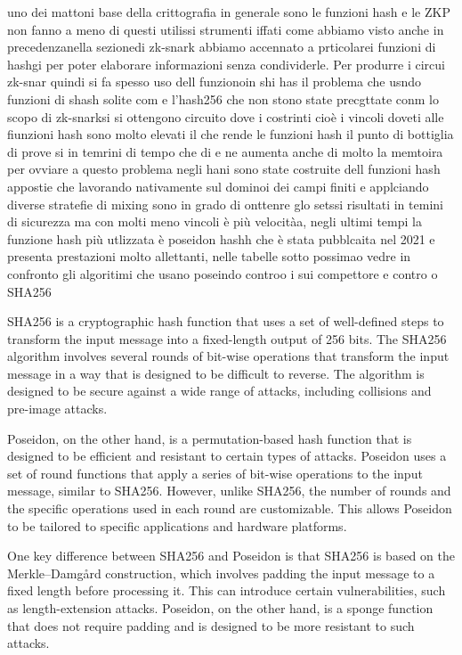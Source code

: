 uno dei mattoni base della crittografia in generale sono le funzioni hash e le ZKP non fanno a meno di questi utilissi
strumenti iffati come abbiamo visto anche in precedenzanella sezionedi zk-snark abbiamo accennato a prticolarei funzioni
di hashgi per poter elaborare informazioni senza condividerle. Per produrre i circui zk-snar quindi si fa spesso uso
dell funzionoin shi has il problema che usndo funzioni di shash solite com e l'hash256 che non stono state precgttate
conm lo scopo di zk-snarksi si ottengono circuito dove i costrinti cioè i vincoli doveti alle fiunzioni hash sono molto
elevati il che rende le funzioni hash il punto di bottiglia di prove si in temrini di tempo che di  e ne aumenta anche
di molto la memtoira per ovviare a questo problema negli hani sono state costruite dell funzioni hash appostie che
lavorando nativamente sul dominoi dei campi finiti e applciando diverse stratefie di mixing sono in grado di onttenre
glo setssi risultati in temini di sicurezza ma con molti meno vincoli è più velocitàa, negli ultimi tempi la funzione
hash più utlizzata è poseidon hashh che è stata pubblcaita nel 2021 e presenta prestazioni molto allettanti, nelle
tabelle sotto possimao vedre in confronto gli algoritimi che usano poseindo controo i sui compettore e contro o SHA256

SHA256 is a cryptographic hash function that uses a set of well-defined steps to transform the input message into a
fixed-length output of 256 bits. The SHA256 algorithm involves several rounds of bit-wise operations that transform the
input message in a way that is designed to be difficult to reverse. The algorithm is designed to be secure against a
wide range of attacks, including collisions and pre-image attacks.

Poseidon, on the other hand, is a permutation-based hash function that is designed to be efficient and resistant to
certain types of attacks. Poseidon uses a set of round functions that apply a series of bit-wise operations to the input
message, similar to SHA256. However, unlike SHA256, the number of rounds and the specific operations used in each round
are customizable. This allows Poseidon to be tailored to specific applications and hardware platforms.

One key difference between SHA256 and Poseidon is that SHA256 is based on the Merkle–Damgård construction, which
involves padding the input message to a fixed length before processing it. This can introduce certain vulnerabilities,
such as length-extension attacks. Poseidon, on the other hand, is a sponge function that does not require padding and is
designed to be more resistant to such attacks.

